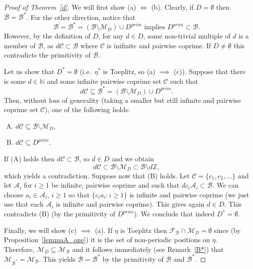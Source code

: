 \documentclass[leqno,a4paper,12pt]{article}
\theoremstyle{definition}
\newcommand{\Z}{{\mathbb{Z}}}
\newcommand{\N}{{\mathbb{N}}}
\newcommand{\cC}{\mathcal{C}}
\newcommand{\sB}{\mathscr{B}}
\begin{document}
\begin{proof}[Proof of Theorem~\ref{d}]
We will first show (a) $\iff$ (b). Clearly, if $D=\emptyset$ then $\sB=\sB^*$. For the other direction, notice that
\[
\sB=\sB^*=(\sB\setminus \mathcal{M}_D)\cup D^{prim} \text{ implies }D^{prim}\subset \sB.
\]
However, by the definition of $D$, for any $d\in D$, some non-trivial multiple of $d$ is a member of $\sB$, as $d\mathcal{C}\subset \sB$ where $\mathcal{C}$ is inifinite and pairwise coprime. If $D\neq\emptyset$ this contradicts the primitivity of $\sB$.


Let us show that $D^*=\emptyset$ (i.e.\ $\eta^*$ is Toeplitz, so (a) $\implies$ (c)). Suppose that there is some $d\in\N$ and some infinite pairwise coprime set $\cC$ such that
\[
d\mathcal{C}\subseteq \sB^*=(\sB\setminus \mathcal{M}_D)\cup D^{prim}.
\]
Then, without loss of generality (taking a smaller but still infinite and pairwise coprime set $\cC$), one of the following holds:
\begin{enumerate}[(A)]
\item
$d\mathcal{C}\subseteq \sB\setminus \mathcal{M}_D$,
\item
$d\mathcal{C}\subseteq D^{prim}$.
\end{enumerate}
If (A) holds then $d\mathcal{C}\subset \sB$, so $d\in D$ and we obtain
\[
d\mathcal{C}\subset \mathscr{B}\setminus \mathcal{M}_D\subset \mathscr{B}\setminus d\Z,
\]
which yields a contradiction. Suppose now that (B) holds. Let $\mathcal{C}=\{c_1,c_2,\dots\}$ and let $\mathcal{A}_i$ for $i\geq 1$ be infinite, pairwise coprime and such that $dc_i\mathcal{A}_i\subset \sB$. We can choose $a_i\in\mathcal{A}_i$, $i\geq 1$ so that $\{c_ia_i:i\geq 1\}$ is infinite and pairwise coprime (we just use that each $\mathcal{A}_i$ is infinite and pairwise coprime). This gives again $d\in D$. This contradicts (B) (by the primitivity of $D^{prim}$). We conclude that indeed $D^*=\emptyset$.


Finally, we will show (c) $\implies$ (a). If $\eta$ is Toeplitz then $\mathcal{F}_\sB\cap \mathcal{M}_D=\emptyset$ since (by Proposition~\ref{lemmaA_one}) it is the set of non-periodic positions on $\eta$. Therefore, $\mathcal{M}_D\subseteq \mathcal{M}_\sB$ and it follows immediately (see Remark~\ref{B*}) that $\mathcal{M}_{\sB^*}=\mathcal{M}_{\sB}$. This yields $\sB=\sB^*$ by the primitivity of $\sB$ and $\sB^*$.


\end{proof}
\end{document}
